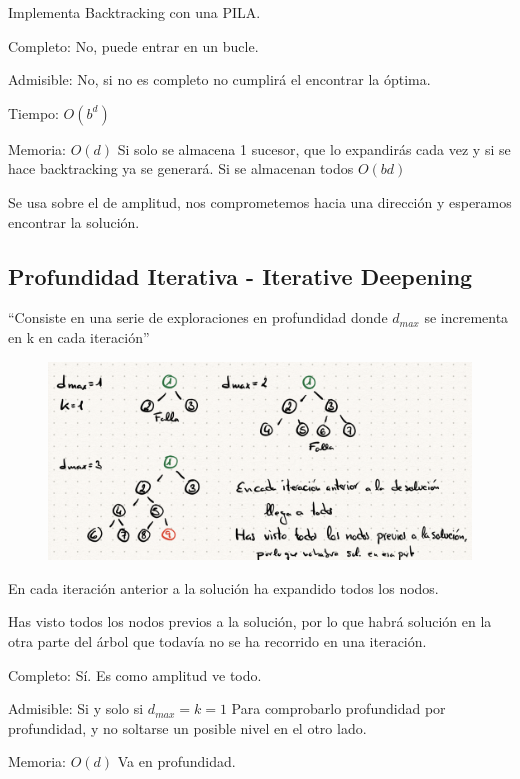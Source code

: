 \documentclass[12pt, twoside, openright]{report} %
\begin{document}
	


	Implementa Backtracking con una PILA.

	Completo: No, puede entrar en un bucle.

	Admisible: No, si no es completo no cumplirá el encontrar la óptima.

	Tiempo: \(O(b^d)\)

	Memoria: \(O(d)\) Si solo se almacena 1 sucesor, que lo expandirás
    cada vez y si se hace backtracking ya se generará. Si se almacenan
    todos \(O(bd)\)
  
    Se usa sobre el de amplitud, nos comprometemos hacia una dirección y
    esperamos encontrar la solución.

	
\subsection{Profundidad Iterativa - Iterative Deepening}

  ``Consiste en una serie de exploraciones en profundidad donde
  \(d_{max}\) se incrementa en k en cada iteración''
  \begin{figure}[H]
	{\includegraphics[scale=.3]{Untitled 49.png}}
\end{figure}


    En cada iteración anterior a la solución ha expandido todos los
    nodos.

	Has visto todos los nodos previos a la solución, por lo que habrá
    solución en la otra parte del árbol que todavía no se ha recorrido
    en una iteración.

	Completo: Sí. Es como amplitud ve todo.

	Admisible: Si y solo si \(d_{max}=k=1\) Para comprobarlo profundidad
    por profundidad, y no soltarse un posible nivel en el otro lado.

	Memoria: \(O(d)\) Va en profundidad.
\end{document}
